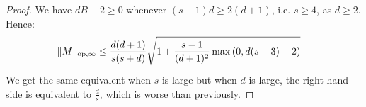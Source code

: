\documentclass[oneside,english,a4paper]{amsart}
\numberwithin{equation}{section}
\numberwithin{figure}{section}
\theoremstyle{plain}
\theoremstyle{definition}
\theoremstyle{plain}
\theoremstyle{remark}
\theoremstyle{plain}
\theoremstyle{definition}
\theoremstyle{definition}
\begin{document}
\begin{proof}
We have $dB-2\ge0$ whenever $(s-1)d\ge2(d+1)$, i.e. $s\ge4$, as
$d\ge2$. Hence:
\begin{align*}
\lVert M\rVert_{\text{op,\ensuremath{\infty}}} & \le\frac{d(d+1)}{s(s+d)}\sqrt{1+\frac{s-1}{(d+1)^{2}}\max\left(0,d(s-3)-2\right)}
\end{align*}
We get the same equivalent when $s$ is large but when $d$ is large,
the right hand side is equivalent to $\frac{d}{s}$, which is worse
than previously.
\end{proof}
\end{document}
